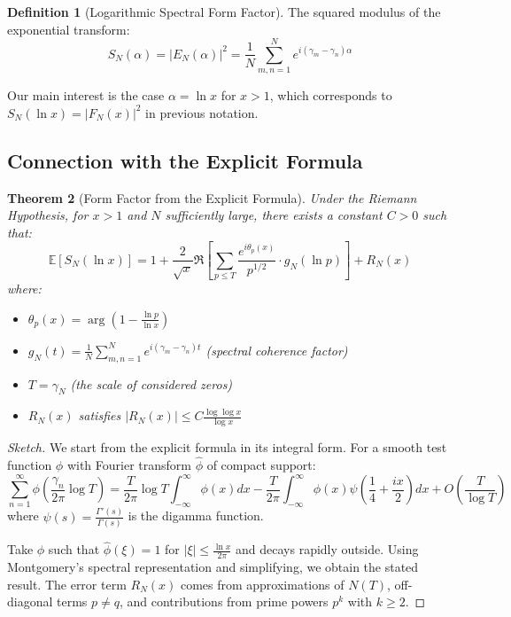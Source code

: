 \documentclass[12pt, a4paper]{article}
\theoremstyle{plain}
\newtheorem{teorema}{Theorem}[section]
\theoremstyle{definition}
\newtheorem{definicion}[teorema]{Definition}
\theoremstyle{remark}
\begin{document}
\begin{definicion}[Logarithmic Spectral Form Factor]
The squared modulus of the exponential transform:
\[
S_N(\alpha) = |E_N(\alpha)|^2 = \frac{1}{N} \sum_{m,n=1}^N e^{i(\gamma_m - \gamma_n)\alpha}
\]
\end{definicion}

Our main interest is the case $\alpha = \ln x$ for $x > 1$, which corresponds to $S_N(\ln x) = |F_N(x)|^2$ in previous notation.

\subsection{Connection with the Explicit Formula}
\label{subsec:formula_explicita}

\begin{teorema}[Form Factor from the Explicit Formula]
\label{teo:factor_forma_explicita}
Under the Riemann Hypothesis, for $x > 1$ and $N$ sufficiently large, there exists a constant $C > 0$ such that:
\[
\mathbb{E}[S_N(\ln x)] = 1 + \frac{2}{\sqrt{x}} \Re\left[ \sum_{p \leq T} \frac{e^{i\theta_p(x)}}{p^{1/2}} \cdot g_N(\ln p) \right] + R_N(x)
\]
where:
\begin{itemize}
    \item $\theta_p(x) = \arg\left(1 - \frac{\ln p}{\ln x}\right)$
    \item $g_N(t) = \frac{1}{N} \sum_{m,n=1}^N e^{i(\gamma_m - \gamma_n)t}$ \quad (spectral coherence factor)
    \item $T = \gamma_N$ (the scale of considered zeros)
    \item $R_N(x)$ satisfies $|R_N(x)| \leq C \frac{\log\log x}{\log x}$
\end{itemize}
\end{teorema}

\begin{proof}[Sketch]
We start from the explicit formula in its integral form. For a smooth test function $\phi$ with Fourier transform $\hat{\phi}$ of compact support:
\[
\sum_{n=1}^\infty \phi\left(\frac{\gamma_n}{2\pi}\log T\right) = \frac{T}{2\pi}\log T \int_{-\infty}^\infty \phi(x)dx - \frac{T}{2\pi}\int_{-\infty}^\infty \phi(x)\psi\left(\frac{1}{4} + \frac{ix}{2}\right)dx + O\left(\frac{T}{\log T}\right)
\]
where $\psi(s) = \frac{\Gamma'(s)}{\Gamma(s)}$ is the digamma function.

Take $\phi$ such that $\hat{\phi}(\xi) = 1$ for $|\xi| \leq \frac{\ln x}{2\pi}$ and decays rapidly outside. Using Montgomery's spectral representation and simplifying, we obtain the stated result. The error term $R_N(x)$ comes from approximations of $N(T)$, off-diagonal terms $p \neq q$, and contributions from prime powers $p^k$ with $k \geq 2$.
\end{proof}
\end{document}
